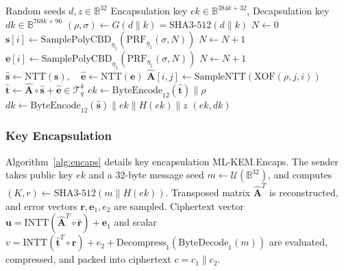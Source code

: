 \renewcommand{\algorithmicrequire}{\textbf{Input:}}
\renewcommand{\algorithmicensure}{\textbf{Output:}}

\begin{algorithm}[t]
\caption{\mbox{ML-KEM.KeyGen}$(d, z)$ \cite{fips203}}
\label{alg:keygen}
\begin{algorithmic}[1]
\Require Random seeds $d, z \in \mathbb{B}^{32}$
\Ensure Encapsulation key $ek \in \mathbb{B}^{384k + 32}$, Decapsulation key $dk \in \mathbb{B}^{768k + 96}$
\State $(\rho, \sigma) \leftarrow G(d \parallel k) = \text{SHA3-512}(d \parallel k)$
\State $N \leftarrow 0$
 
    \State $\mathbf{s}[i] \leftarrow \text{SamplePolyCBD}_{\eta_1}(\text{PRF}_{\eta_1}(\sigma, N))$
    \State $N \leftarrow N + 1$
\EndFor
{} 
    \State $\mathbf{e}[i] \leftarrow \text{SamplePolyCBD}_{\eta_1}(\text{PRF}_{\eta_1}(\sigma, N))$
    \State $N \leftarrow N + 1$
\EndFor
\State $\hat{\mathbf{s}} \leftarrow \text{NTT}(\mathbf{s}), \quad \hat{\mathbf{e}} \leftarrow \text{NTT}(\mathbf{e})$
 
        \State $\hat{\mathbf{A}}[i, j] \leftarrow \text{SampleNTT}(\text{XOF}(\rho, j, i))$
    \EndFor
\EndFor
\State $\hat{\mathbf{t}} \leftarrow \hat{\mathbf{A}} \circ \hat{\mathbf{s}} + \hat{\mathbf{e}} \in \mathcal{T}_q^k$
\State $ek \leftarrow \text{ByteEncode}_{12}(\hat{\mathbf{t}}) \parallel \rho$
\State $dk \leftarrow \text{ByteEncode}_{12}(\hat{\mathbf{s}}) \parallel ek \parallel H(ek) \parallel z$
\State \Return $(ek, dk)$
\end{algorithmic}
\end{algorithm}

\subsubsection{Key Encapsulation}
Algorithm~\ref{alg:encaps} details key encapsulation \mbox{ML-KEM.Encaps}. The sender takes public key $ek$ and a 32-byte message seed $m \leftarrow \mathcal{U}(\mathbb{B}^{32})$, and computes $(K, r) \leftarrow \text{SHA3-512}(m \parallel H(ek))$. Transposed matrix $\hat{\mathbf{A}}^T$ is reconstructed, and error vectors $\mathbf{r}, \mathbf{e}_1, e_2$ are sampled. Ciphertext vector $\mathbf{u} = \text{INTT}(\hat{\mathbf{A}}^T \circ \hat{\mathbf{r}}) + \mathbf{e}_1$ and scalar $v = \text{INTT}(\hat{\mathbf{t}}^T \circ \hat{\mathbf{r}}) + e_2 + \text{Decompress}_1(\text{ByteDecode}_1(m))$ are evaluated, compressed, and packed into ciphertext $c = c_1 \parallel c_2$.

